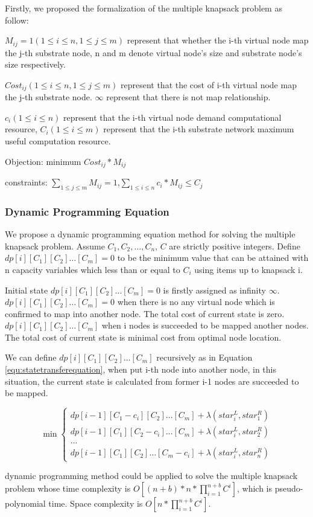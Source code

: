 Firstly, we proposed the formalization of the multiple knapsack problem as follow:

$M_{ij}=1(1\leq i\leq n,1 \leq j \leq m)$ represent that whether the i-th virtual node map the j-th substrate node, n and m denote virtual node's size and substrate node's size respectively.

$Cost_{ij}(1\leq i\leq n,1 \leq j \leq m)$ represent that the cost of i-th virtual node map the j-th substrate node. $\infty$ represent that there is not map relationship.

$c_i(1\leq i\leq n)$ represent that the i-th virtual node demand computational resource, $C_i(1\leq i\leq m)$ represent that the i-th substrate network maximum useful computation resource.

Objection: minimum $Cost_{ij}*M_{ij}$

constraints: $\sum\limits_{1\leq j\leq m} M_{ij}=1$,$\sum\limits_{1\leq i\leq n} c_i*M_{ij}\leq C_j$

\subsubsection{Dynamic Programming Equation}
\label{lab:DynamicProgrammingEquation}
We propose a dynamic programming equation method for solving the multiple knapsack problem. Assume $C_1,C_2,\ldots,C_n$, $C$ are strictly positive integers. Define $dp[i][{C_1}][{C_2}] \ldots [{C_m}]=0$ to be the minimum value that can be attained with n capacity variables  which less than or equal to $C_i$ using items up to knapsack i.

Initial state $dp[i][{C_1}][{C_2}] \ldots [{C_m}]=0$ is firstly assigned as infinity $\infty$. $dp[i][{C_1}][{C_2}] \ldots [{C_m}]=0$ when there is no any virtual node which is confirmed to map into another node. The total cost of current state is zero. $dp[i][{C_1}][{C_2}] \ldots [{C_m}]$ when  i nodes is succeeded to be mapped another nodes. The total cost of current state is minimal cost from optimal node location.

We can define $dp[i][{C_1}][{C_2}] \ldots [{C_m}]$ recursively as in Equation \ref{equ:statetransferequation}, when put i-th node into another node, in this situation, the current state is calculated from former i-1 nodes are succeeded to be mapped.

\begin{equation}
\label{equ:statetransferequation}
\min \left\{ \begin{array}{l}
dp[i - 1][{C_1-c_i}][{C_2}] \ldots [{C_m}]+\lambda(star^L_i,star^R_1)\\
dp[i - 1][{C_1}][{C_2-c_i}] \ldots [{C_m}]+\lambda(star^L_i,star^R_2)\\
...\\
dp[i - 1][{C_1}][{C_2}] \ldots [{C_m-c_i}]+\lambda(star^L_i,star^R_n)
\end{array} \right.
\end{equation}

dynamic programming method  could be applied to solve the multiple knapsack problem whose time complexity is $O[(n+b)*n*\prod_{i=1}^{n+b}C^i]$, which is pseudo-polynomial time. Space complexity is $O[n*\prod_{i=1}^{n+b}C^i]$.



